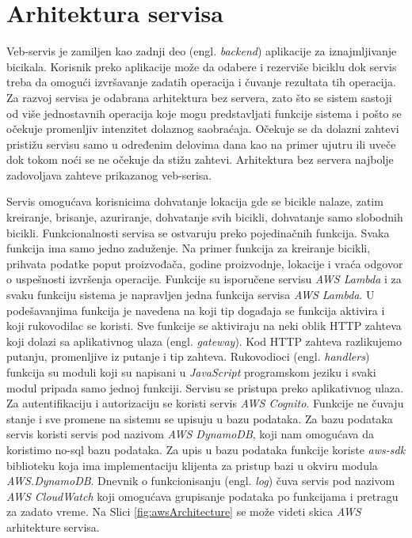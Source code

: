 \documentclass[12pt,oneside]{memoir}
\begin{document}
\section{Arhitektura servisa}

Veb-servis je zamiljen kao zadnji deo (engl. \emph{backend}) aplikacije za iznajmljivanje bicikala. Korisnik preko aplikacije može da odabere i rezerviše biciklu dok servis treba da omogući izvršavanje zadatih operacija i čuvanje rezultata tih operacija. Za razvoj servisa je odabrana arhitektura bez servera, zato što se sistem sastoji od više jednostavnih operacija koje mogu predstavljati funkcije sistema i pošto se očekuje promenljiv intenzitet dolaznog saobraćaja. Očekuje se da dolazni zahtevi pristižu servisu samo u određenim delovima dana kao na primer ujutru ili uveče dok tokom noći se ne očekuje da stižu zahtevi. Arhitektura bez servera najbolje zadovoljava zahteve prikazanog veb-serisa.


Servis omogućava korisnicima dohvatanje lokacija gde se bicikle nalaze, zatim kreiranje, brisanje, azuriranje, dohvatanje svih bicikli, dohvatanje samo slobodnih bicikli. Funkcionalnosti servisa se ostvaruju preko pojedinačnih funkcija. Svaka funkcija ima samo jedno zaduženje. Na primer funkcija za kreiranje bicikli, prihvata podatke poput proizvođača, godine proizvodnje, lokacije i vraća odgovor o uspešnosti izvršenja operacije. Funkcije su isporučene servisu \emph{AWS Lambda} i za svaku funkciju sistema je napravljen jedna funkcija servisa \emph{AWS Lambda}. U podešavanjima funkcija je navedena na koji tip događaja se funkcija aktivira i koji rukovodilac se koristi. Sve funkcije se aktiviraju na neki oblik HTTP zahteva koji dolazi sa aplikativnog ulaza (engl. \emph{gateway}). Kod HTTP zahteva razlikujemo putanju, promenljive iz putanje i tip zahteva. Rukovodioci (engl. \emph{handlers}) funkcija su moduli koji su napisani u \emph{JavaScript} programskom jeziku i svaki modul pripada samo jednoj funkciji. Servisu se pristupa preko aplikativnog ulaza. Za autentifikaciju i autorizaciju se koristi servis \emph{AWS Cognito}. Funkcije ne čuvaju stanje i sve promene na sistemu se upisuju u bazu podataka. Za bazu podataka servis koristi servis pod nazivom \emph{AWS DynamoDB}, koji nam omogućava da koristimo no-sql bazu podataka. Za upis u bazu podataka funkcije koriste \emph{aws-sdk} biblioteku koja ima implementaciju klijenta za pristup bazi u okviru modula \emph{AWS.DynamoDB}. Dnevnik o funkcionisanju (engl. \emph{log}) čuva servis pod nazivom \emph{AWS CloudWatch} koji  omogućava grupisanje podataka po funkcijama i pretragu za zadato vreme. Na Slici \ref{fig:awsArchitecture} se može videti skica \emph{AWS} arhitekture servisa.
\end{document}
